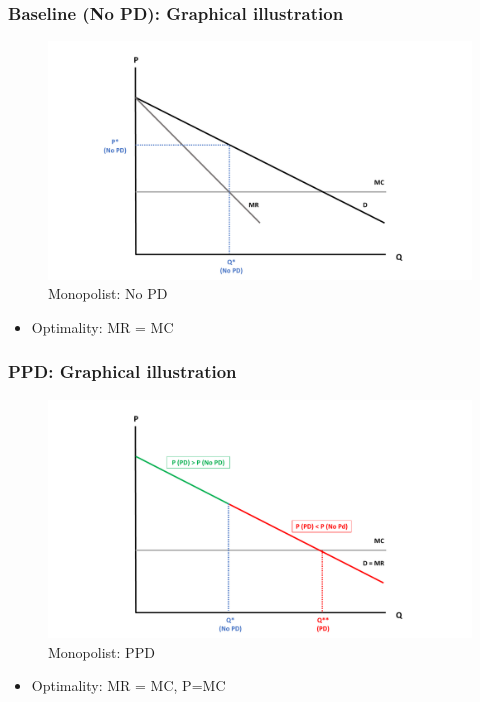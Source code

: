 \documentclass[10pt]{beamer}
\begin{document}
\begin{frame} 
	\frametitle{Baseline (No PD): Graphical illustration}


 \begin{figure}[H]
	\centering
	\includegraphics[width=0.8\linewidth]{no_pd}
	\caption{Monopolist: No PD \\ 
\label{fig:nopd}}

\end{figure}

\begin{itemize}
	\item Optimality: MR = MC
\end{itemize}


	
\end{frame}

\begin{frame} 
	\frametitle{PPD: Graphical illustration}
	
	
	\begin{figure}[H]
		\centering
		\includegraphics[width=0.8\linewidth]{pd}
		\caption{Monopolist: PPD \\ 
			\label{fig:ppd}}
		
	\end{figure}
	
	\begin{itemize}
		\item Optimality: MR = MC, P=MC
	\end{itemize}
	

\end{frame}
\end{document}
